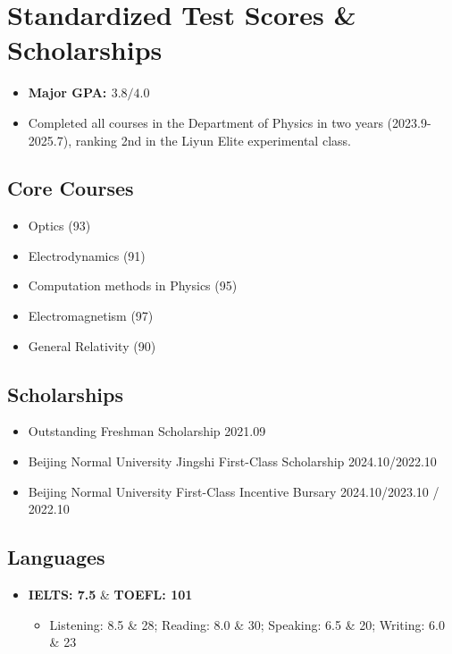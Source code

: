 \documentclass[a4paper, 12pt]{ctexart}
\begin{document}
\newpage
\section*{Standardized Test Scores \& Scholarships} %

\begin{itemize}
    \item \textbf{Major GPA: $3.8/4.0$} %
    \item Completed all courses in the Department of Physics in two years (2023.9-2025.7), ranking 2nd in the Liyun Elite experimental class. %
\end{itemize}

\subsection*{Core Courses} %
\begin{itemize}
    \item Optics (93) %
    \item Electrodynamics (91) %
    \item Computation methods in Physics (95) %
    \item Electromagnetism (97) %
    \item General Relativity (90) %
\end{itemize}

\subsection*{Scholarships} %
\begin{itemize}
    \item Outstanding Freshman Scholarship \hfill 2021.09 %
    \item Beijing Normal University Jingshi First-Class Scholarship \hfill 2024.10/2022.10 %
    \item Beijing Normal University First-Class Incentive Bursary \hfill 2024.10/2023.10 / 2022.10 %
\end{itemize}

\subsection*{Languages} %
\begin{itemize}
    \item \textbf{IELTS: 7.5} \& \textbf{TOEFL: 101} %
    \begin{itemize}
        \item Listening: 8.5 \& 28; Reading: 8.0 \& 30; Speaking: 6.5 \& 20; Writing: 6.0 \& 23 %
    \end{itemize}
\end{itemize}
\end{document}
